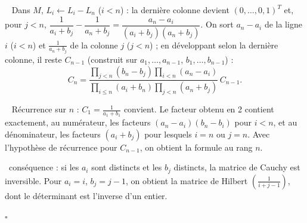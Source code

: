 \documentclass[a4paper,11pt]{article}
\numberwithin{equation}{section}
\numberwithin{figure}{section}
\numberwithin{table}{section}
\theoremstyle{enonce}
\theoremstyle{exemple}
\theoremstyle{remarque}
\newcommand{\gain}[1]{\par\noindent{\sffamily\bfseries\small\color{Ocre}Astuce.}\ #1\par}
\newcommand{\q}[1]{\par\smallskip\noindent{\sffamily\bfseries\color{Bleu}#1}\ }
\begin{document}
\q{2.} Dans $M$, $L_i\leftarrow L_i-L_n$ ($i<n$) : la dernière colonne devient $(0,\dots,0,1)^T$ et, pour $j<n$, $\dfrac1{a_i+b_j}-\dfrac1{a_n+b_j}=\dfrac{a_n-a_i}{(a_i+b_j)(a_n+b_j)}$. On sort $a_n-a_i$ de la ligne $i$ ($i<n$) et $\frac1{a_n+b_j}$ de la colonne $j$ ($j<n$) ; en développant selon la dernière colonne, il reste $C_{n-1}$ (construit sur $a_1,\dots,a_{n-1}$, $b_1,\dots,b_{n-1}$) :
\[C_n=\frac{\prod_{j<n}(b_n-b_j)\prod_{i<n}(a_n-a_i)}{\prod_{i\leq n}(a_i+b_n)\prod_{j<n}(a_n+b_j)}\,C_{n-1}.\]

\q{3.} Récurrence sur $n$ : $C_1=\frac1{a_1+b_1}$ convient. Le facteur obtenu en 2 contient exactement, au numérateur, les facteurs $(a_n-a_i)(b_n-b_i)$ pour $i<n$, et au dénominateur, les facteurs $(a_i+b_j)$ pour lesquels $i=n$ ou $j=n$. Avec l'hypothèse de récurrence pour $C_{n-1}$, on obtient la formule au rang $n$.
\gain{conséquence : si les $a_i$ sont distincts et les $b_j$ distincts, la matrice de Cauchy est inversible. Pour $a_i=i$, $b_j=j-1$, on obtient la matrice de Hilbert $\left(\frac1{i+j-1}\right)$, dont le déterminant est l'inverse d'un entier.}
\par\hfill\textcolor{BleuClair}{$\square$}\par
\end{document}
